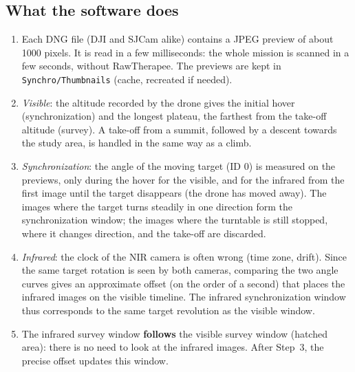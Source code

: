 \documentclass[a4paper,11pt]{report}
\begin{document}
\subsection*{What the software does}
\begin{enumerate}
	\item Each DNG file (DJI and SJCam alike) contains a JPEG preview of about 1000 pixels. It is read in a few milliseconds: the whole mission is scanned in a few seconds, without RawTherapee. The previews are kept in \texttt{Synchro/Thumbnails} (cache, recreated if needed).
	\item \emph{Visible}: the altitude recorded by the drone gives the initial hover (synchronization) and the longest plateau, the farthest from the take-off altitude (survey). A take-off from a summit, followed by a descent towards the study area, is handled in the same way as a climb.
	\item \emph{Synchronization}: the angle of the moving target (ID 0) is measured on the previews, only during the hover for the visible, and for the infrared from the first image until the target disappears (the drone has moved away). The images where the target turns steadily in one direction form the synchronization window; the images where the turntable is still stopped, where it changes direction, and the take-off are discarded.
	\item \emph{Infrared}: the clock of the NIR camera is often wrong (time zone, drift). Since the same target rotation is seen by both cameras, comparing the two angle curves gives an approximate offset (on the order of a second) that places the infrared images on the visible timeline. The infrared synchronization window thus corresponds to the same target revolution as the visible window.
	\item The infrared survey window \textbf{follows} the visible survey window (hatched area): there is no need to look at the infrared images. After Step~3, the precise offset updates this window.
\end{enumerate}
\end{document}
